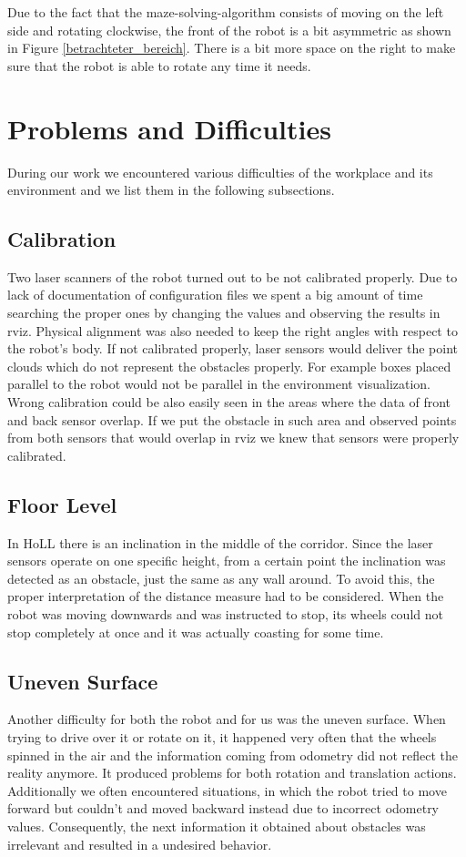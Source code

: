Due to the fact that the maze-solving-algorithm consists of moving on the left side and rotating clockwise, the front of the robot is a bit asymmetric as shown in Figure \ref{betrachteter_bereich}. There is a bit more space on the right to make sure that the robot is able to rotate any time it needs.

\section{Problems and Difficulties} \label{problems}
During our work we encountered various difficulties of the workplace and its environment and we list them in the following subsections.

\subsection{Calibration}
Two laser scanners of the robot turned out to be not calibrated properly. Due to lack of documentation of configuration files we spent a big amount of time searching the proper ones by changing the values and observing the results in rviz. Physical alignment was also needed to keep the right angles with respect to the robot's body. If not calibrated properly, laser sensors would deliver the point clouds which do not represent the obstacles properly. For example boxes placed parallel to the robot would not be parallel in the environment visualization. Wrong calibration could be also easily seen in the areas where the data of front and back sensor overlap. If we put the obstacle in such area and observed points from both sensors that would overlap in rviz we knew that sensors were properly calibrated.

\subsection{Floor Level}
In HoLL there is an inclination in the middle of the corridor. Since the laser sensors operate on one specific height, from a certain point the inclination was detected as an obstacle, just the same as any wall around. To avoid this, the proper interpretation of the distance measure had to be considered.
When the robot was moving downwards and was instructed to stop, its wheels could not stop completely at once and it was actually coasting for some time.

\subsection{Uneven Surface}
Another difficulty for both the robot and for us was the uneven surface. When trying to drive over it or rotate on it, it happened very often that the wheels spinned in the air and the information coming from odometry did not reflect the reality anymore. It produced problems for both rotation and translation actions. Additionally we often encountered situations, in which the robot tried to move forward but couldn't and moved backward  instead due to incorrect odometry values. Consequently, the next information it obtained about obstacles was irrelevant and resulted in a undesired behavior.

